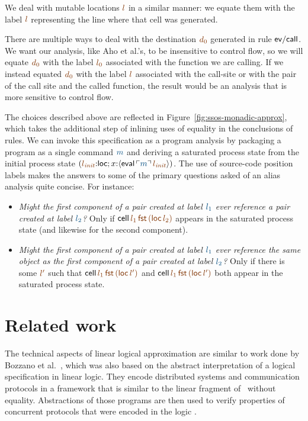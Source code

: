 We deal with mutable locations $\lf{l}$ in a similar manner: we equate them
with the label $\lf{l}$ representing the line where that cell was
generated.

There are multiple ways to deal with the destination $\lf{d_0}$ generated
in rule ${\sf ev/call}$. We want our analysis, like Aho et al.'s, to
be insensitive to control flow, so we will equate $\lf{d_0}$ with the label
$\lf{l_0}$ associated with the function we are calling.  If we instead
equated $\lf{d_0}$ with the label $\lf{l}$ associated with the call-site or with
the pair of the call site and the called function, the result would be
an analysis that is more sensitive to control flow.

The choices described above are reflected in
Figure~\ref{fig:ssos-monadic-approx}, which takes the additional step
of inlining uses of equality in the conclusions of rules. We can
invoke this specification as a program analysis by packaging a program
as a single command $\obj{m}$ and deriving a saturated process state from the
initial process state $(\lf{l_{\it init}}{:}{\sf loc}; x{:}\susp{{\sf
    eval}\,\interp{m}\,\lf{l_{\it init}}})$. 
The use of source-code position labels
makes the answers to some of the primary questions asked of an alias
analysis quite concise. For instance:

\smallskip
\begin{itemize}
\item {\it Might the first component of a pair created at label
    $\obj{l_1}$ ever reference a pair created at label $\obj{l_2}$?}
  Only if ${\sf cell}\,\lf{l_1}\,\lf{\sf fst}\,\lf{({\sf loc}\,l_2)}$
  appears in the saturated process state (and likewise for the second
  component).
\item {\it Might the first component of a pair created at label
    $\obj{l_1}$ ever reference the same object as the first component
    of a pair created at label $\obj{l_2}$?} Only if there is some
  $\lf{l'}$ such that ${\sf cell}\,\lf{l_1}\,\lf{\sf fst}\,\lf{({\sf
      loc}\,l')}$ and ${\sf cell}\,\lf{l_1}\,\lf{\sf fst}\,\lf{({\sf
      loc}\,l')}$ both appear in the saturated process state.
\end{itemize}

\section{Related work}
\label{sec:approximately-related}

The technical aspects of linear logical approximation are similar to
work done by Bozzano et al.~\cite{bozzano02effective,bozzano04model},
which was also based on the abstract interpretation of a logical
specification in linear logic.
They encode distributed systems and communication protocols in
a framework that is similar to the linear fragment of \sls~without
equality. Abstractions of those programs are then used to verify
properties of concurrent protocols that were encoded in the logic
\cite{bozzano02protocol}. 

